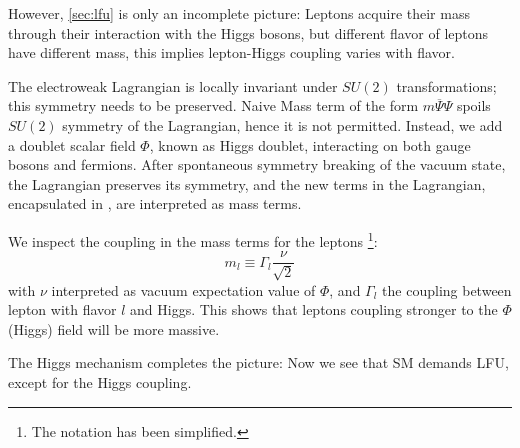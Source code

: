 However, \autoref{sec:lfu} is only an incomplete picture:
Leptons acquire their mass through their interaction with the Higgs bosons,
but different flavor of leptons have different mass, this implies lepton-Higgs coupling varies with flavor. 

The electroweak Lagrangian is locally invariant under $SU(2)$ transformations;
this symmetry needs to be preserved.
Naive Mass term of the form $m \overline{\Psi} \Psi$
spoils $SU(2)$ symmetry of the Lagrangian, hence it is not permitted.
Instead, we add a doublet scalar field $\Phi$, known as Higgs doublet, interacting on both gauge bosons
and fermions.
After spontaneous symmetry breaking of the vacuum state, the Lagrangian preserves its 
symmetry, and the new terms in the Lagrangian, encapsulated in , are interpreted as mass terms.

We inspect the coupling in the mass terms for the leptons \cite{Langacker:2010zza}\footnote{
    The notation has been simplified.
}:
\begin{equation}
    m_l \equiv \Gamma_l \frac{\nu}{\sqrt{2}}
\end{equation}
with $\nu$ interpreted as vacuum expectation value of $\Phi$, and $\Gamma_l$ the coupling between lepton with flavor $l$ and Higgs.
This shows that leptons coupling stronger to the $\Phi$ (Higgs) field will be
more massive.

The Higgs mechanism completes the picture:
Now we see that SM demands LFU, except for the Higgs coupling.
